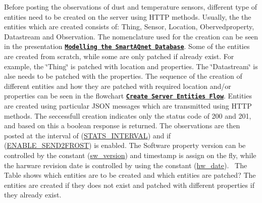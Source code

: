 Before posting the observations of dust and temperature sensors, different type of entities need to be created on the server using H\+T\+TP methods. Usually, the the entities which are created consists of\+: Thing, Sensor, Location, Obervedproperty, Datastream and Observation. The nomenclature used for the creation can be seen in the presentation \href{modelling.pdf}{\texttt{ {\bfseries{Modelling the Smart\+A\+Qnet Database}}}}. Some of the entities are created from scratch, while some are only patched if already exist. For example, the \char`\"{}\+Thing\char`\"{} is patched with location and properties. The \char`\"{}\+Datastream\char`\"{} is alse needs to be patched with the properties. The sequence of the creation of different entities and how they are patched with required location and/or properties can be seen in the flowchart \href{CreateEntitiesFlow.pdf}{\texttt{ {\bfseries{Create Server Entities Flow}}}}. Entities are created using particular J\+S\+ON messages which are transmitted using H\+T\+TP methods. The seccessfull creation indicates only the status code of 200 and 201, and based on this a boolean response is returned. The observations are then posted at the interval of (\mbox{\hyperlink{main_8h_aef6021251fa63b1e73a98864b809904e}{S\+T\+A\+T\+S\+\_\+\+I\+N\+T\+E\+R\+V\+AL}}) and if (\mbox{\hyperlink{main_8h_af58473239b566ebd1187b4cc8c71e97d}{E\+N\+A\+B\+L\+E\+\_\+\+S\+E\+N\+D2\+F\+R\+O\+ST}}) is enabled. The Software property version can be controlled by the constant (\mbox{\hyperlink{main_8h_af06baee05280c189592215d5ea08e7ef}{sw\+\_\+version}}) and timestamp is assign on the fly, while the harware revision date is controlled by using the constant (\mbox{\hyperlink{main_8h_acbd8a4cec684c263a6cc312c70d45ef3}{hw\+\_\+date}}).~\newline
 The Table  shows which entities are to be created and which entities are patched? The entities are created if they does not exist and patched with different properties if they already exist.

